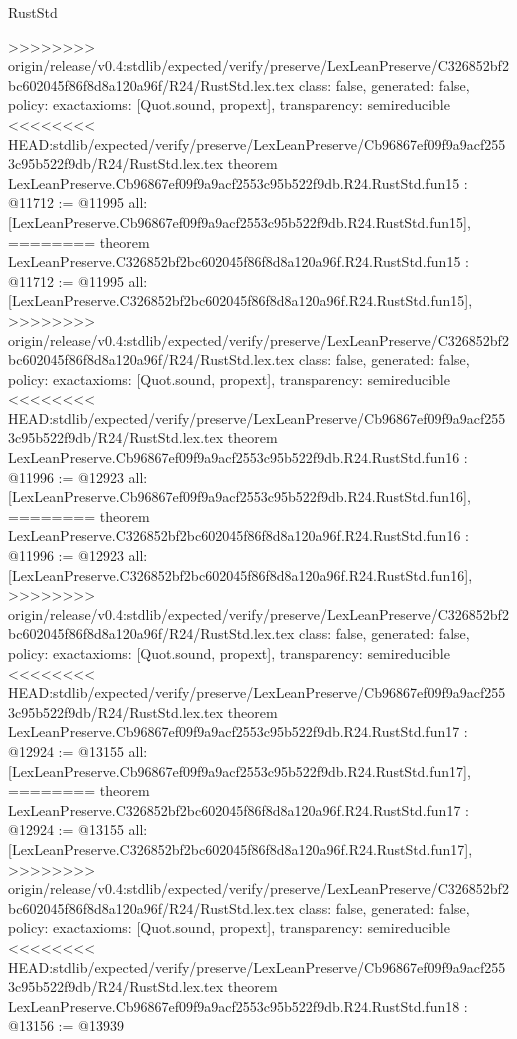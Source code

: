 \begin{lexlean}{RustStd}
\begin{coremodule}
{\begin{coremodule}
{{{{{{{{{{{{{{{{{{>>>>>>>> origin/release/v0.4:stdlib/expected/verify/preserve/LexLeanPreserve/C326852bf2bc602045f86f8d8a120a96f/R24/RustStd.lex.tex
  class: false,
  generated: false,
  policy: exact{axioms: [Quot.sound, propext]},
  transparency: semireducible
}
<<<<<<<< HEAD:stdlib/expected/verify/preserve/LexLeanPreserve/Cb96867ef09f9a9acf2553c95b522f9db/R24/RustStd.lex.tex
theorem LexLeanPreserve.Cb96867ef09f9a9acf2553c95b522f9db.R24.RustStd.fun15 : @11712 := @11995 {
  all: [LexLeanPreserve.Cb96867ef09f9a9acf2553c95b522f9db.R24.RustStd.fun15],
========
theorem LexLeanPreserve.C326852bf2bc602045f86f8d8a120a96f.R24.RustStd.fun15 : @11712 := @11995 {
  all: [LexLeanPreserve.C326852bf2bc602045f86f8d8a120a96f.R24.RustStd.fun15],
>>>>>>>> origin/release/v0.4:stdlib/expected/verify/preserve/LexLeanPreserve/C326852bf2bc602045f86f8d8a120a96f/R24/RustStd.lex.tex
  class: false,
  generated: false,
  policy: exact{axioms: [Quot.sound, propext]},
  transparency: semireducible
}
<<<<<<<< HEAD:stdlib/expected/verify/preserve/LexLeanPreserve/Cb96867ef09f9a9acf2553c95b522f9db/R24/RustStd.lex.tex
theorem LexLeanPreserve.Cb96867ef09f9a9acf2553c95b522f9db.R24.RustStd.fun16 : @11996 := @12923 {
  all: [LexLeanPreserve.Cb96867ef09f9a9acf2553c95b522f9db.R24.RustStd.fun16],
========
theorem LexLeanPreserve.C326852bf2bc602045f86f8d8a120a96f.R24.RustStd.fun16 : @11996 := @12923 {
  all: [LexLeanPreserve.C326852bf2bc602045f86f8d8a120a96f.R24.RustStd.fun16],
>>>>>>>> origin/release/v0.4:stdlib/expected/verify/preserve/LexLeanPreserve/C326852bf2bc602045f86f8d8a120a96f/R24/RustStd.lex.tex
  class: false,
  generated: false,
  policy: exact{axioms: [Quot.sound, propext]},
  transparency: semireducible
}
<<<<<<<< HEAD:stdlib/expected/verify/preserve/LexLeanPreserve/Cb96867ef09f9a9acf2553c95b522f9db/R24/RustStd.lex.tex
theorem LexLeanPreserve.Cb96867ef09f9a9acf2553c95b522f9db.R24.RustStd.fun17 : @12924 := @13155 {
  all: [LexLeanPreserve.Cb96867ef09f9a9acf2553c95b522f9db.R24.RustStd.fun17],
========
theorem LexLeanPreserve.C326852bf2bc602045f86f8d8a120a96f.R24.RustStd.fun17 : @12924 := @13155 {
  all: [LexLeanPreserve.C326852bf2bc602045f86f8d8a120a96f.R24.RustStd.fun17],
>>>>>>>> origin/release/v0.4:stdlib/expected/verify/preserve/LexLeanPreserve/C326852bf2bc602045f86f8d8a120a96f/R24/RustStd.lex.tex
  class: false,
  generated: false,
  policy: exact{axioms: [Quot.sound, propext]},
  transparency: semireducible
}
<<<<<<<< HEAD:stdlib/expected/verify/preserve/LexLeanPreserve/Cb96867ef09f9a9acf2553c95b522f9db/R24/RustStd.lex.tex
theorem LexLeanPreserve.Cb96867ef09f9a9acf2553c95b522f9db.R24.RustStd.fun18 : @13156 := @13939 {
}}}}}}}}}}}}}}}}}}}}}
\end{coremodule}}
\end{coremodule}
\end{lexlean}
